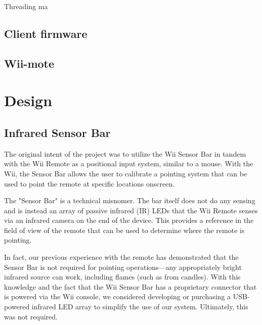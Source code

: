 \documentclass[conf]{new-aiaa}
\begin{document}
        
        Threading ma
        
        
    
    \subsection{Client firmware}
    \subsection{Wii-mote}


\section{Design}

    \subsection{Infrared Sensor Bar}
    
        The original intent of the project was to utilize the Wii Sensor Bar in tandem with the Wii Remote as a positional input system, similar to a mouse. With the Wii, the Sensor Bar allows the user to calibrate a pointing system that can be used to point the remote at specific locations onscreen.
        
        The "Sensor Bar" is a technical misnomer. The bar itself does not do any sensing and is instead an array of passive infrared (IR) LEDs that the Wii Remote senses via an infrared camera on the end of the device. This provides a reference in the field of view of the remote that can be used to determine where the remote is pointing.
        
        In fact, our previous experience with the remote has demonstrated that the Sensor Bar is not required for pointing operations---any appropriately bright infrared source can work, including flames (such as from candles). With this knowledge and the fact that the Wii Sensor Bar has a proprietary connector that is powered via the Wii console, we considered developing or purchasing a USB-powered infrared LED array to simplify the use of our system. Ultimately, this was not required.
        
\end{document}
